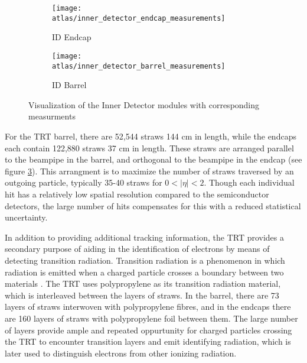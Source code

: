             \begin{figure}
                \begin{subfigure}{.48\textwidth}
                    \texttt{[image: atlas/inner\_detector\_endcap\_measurements]}
                    \caption{ID Endcap}
                    \label{fig:inner_detector_endcap_measurements}
                \end{subfigure}
                \begin{subfigure}{.48\textwidth}
                    \texttt{[image: atlas/inner\_detector\_barrel\_measurements]}
                    \caption{ID Barrel}
                    \label{fig:inner_detector_barrel_measurements}
                \end{subfigure}
                \caption{Visualization of the Inner Detector modules with corresponding measurments \cite{atlas_tdr}}
                \label{fig:inner_detector_measurements}
            \end{figure}

            For the TRT barrel, there are 52,544 straws 144 cm in length, while the endcaps each contain 122,880 straws 37 cm in length.
            These straws are arranged parallel to the beampipe in the barrel, and orthogonal to the beampipe in the endcap (see figure \ref{fig:inner_detector_measurements}).
            This arrangment is to maximize the number of straws traversed by an outgoing particle, typically 35-40 straws for $0 < |\eta| < 2$.
            Though each individual hit has a relatively low spatial resolution compared to the semiconductor detectors, the large number of hits compensates for this with a reduced statistical uncertainty.

            In addition to providing additional tracking information, the TRT provides a secondary purpose of aiding in the identification of electrons by means of detecting transition radiation. 
            Transition radiation is a phenomenon in which radiation is emitted when a charged particle crosses a boundary between two materials \cite{transition_radiation}.
            The TRT uses polypropylene as its transition radiation material, which is interleaved between the layers of straws.
            In the barrel, there are 73 layers of straws interwoven with polypropylene fibres, and in the endcaps there are 160 layers of straws with polypropylene foil between them.
            The large number of layers provide ample and repeated oppurtunity for charged particles crossing the TRT to encounter transition layers and emit identifying radiation, which is later used to distinguish electrons from other ionizing radiation.


